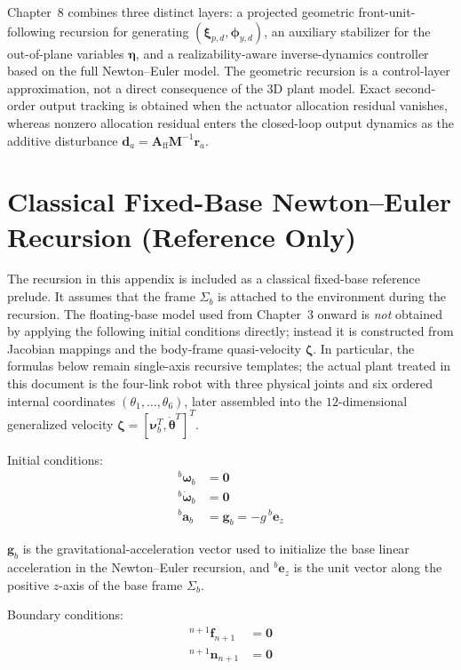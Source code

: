 \documentclass[12pt,a4paper]{report}
\newcommand{\newsymbols}[1]{\par\noindent{}#1\par\vspace{0.35em}}
\newcommand{\vect}[1]{\mathbf{#1}}
\newcommand{\Frame}[1]{\Sigma_{#1}}
\newcommand{\angvel}{\boldsymbol{\omega}}
\begin{document}
Chapter~8 combines three distinct layers: a projected geometric front-unit-following recursion for generating $(\boldsymbol{\xi}_{p,d},\boldsymbol{\phi}_{y,d})$, an auxiliary stabilizer for the out-of-plane variables $\boldsymbol{\eta}$, and a realizability-aware inverse-dynamics controller based on the full Newton--Euler model. The geometric recursion is a control-layer approximation, not a direct consequence of the 3D plant model. Exact second-order output tracking is obtained when the actuator allocation residual vanishes, whereas nonzero allocation residual enters the closed-loop output dynamics as the additive disturbance $\mathbf{d}_a=\mathbf{A}_{\mathrm{ff}}\mathbf{M}^{-1}\mathbf{r}_a$.


\appendix

\chapter{Classical Fixed-Base Newton--Euler Recursion (Reference Only)}
\label{app:fixed-base-ne-recursion}

The recursion in this appendix is included as a classical fixed-base reference prelude. It assumes that the frame $\Frame{b}$ is attached to the environment during the recursion. The floating-base model used from Chapter~3 onward is \emph{not} obtained by applying the following initial conditions directly; instead it is constructed from Jacobian mappings and the body-frame quasi-velocity $\boldsymbol{\zeta}$. In particular, the formulas below remain single-axis recursive templates; the actual plant treated in this document is the four-link robot with three physical joints and six ordered internal coordinates $(\theta_1,\ldots,\theta_6)$, later assembled into the $12$-dimensional generalized velocity $\boldsymbol{\zeta} = [\boldsymbol{\nu}_b^T,\dot{\boldsymbol{\theta}}^T]^T$.

Initial conditions:
\begin{align}
{}^{b}\angvel_{b} &= \vect{0} \\
{}^{b}\dot{\angvel}_{b} &= \vect{0} \\
{}^{b}\vect{a}_{b} &= \vect{g}_{b} = -g\,{}^{b}\vect{e}_{z}
\end{align}
\newsymbols{$\vect{g}_{b}$ is the gravitational-acceleration vector used to initialize the base linear acceleration in the Newton--Euler recursion, and ${}^{b}\vect{e}_{z}$ is the unit vector along the positive $z$-axis of the base frame $\Frame{b}$.}

Boundary conditions:
\begin{align}
{}^{n+1}\vect{f}_{n+1} &= \vect{0} \\
{}^{n+1}\vect{n}_{n+1} &= \vect{0}
\end{align}
\end{document}
